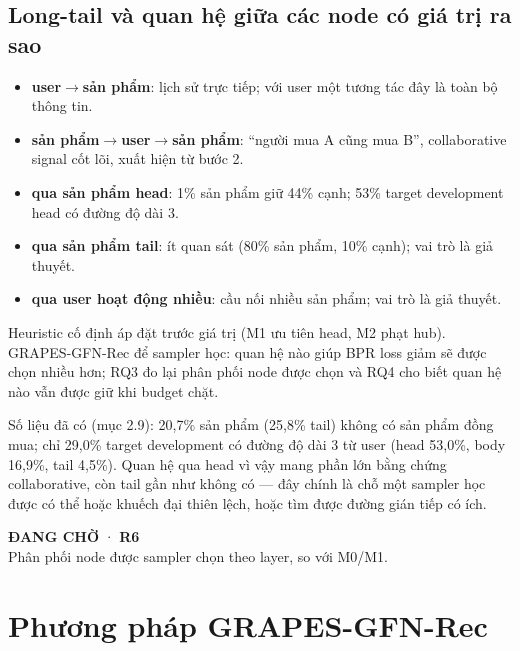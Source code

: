 \documentclass[11pt,a4paper,oneside]{report}
\newcommand{\pending}[2]{\begin{tcolorbox}[colback=amberpale,colframe=amber,boxrule=0.8pt,arc=2pt,left=6pt,right=6pt,top=4pt,bottom=4pt,fontupper=\small]\textbf{\color{coral}ĐANG CHỜ} · \textbf{#1}\\ #2\end{tcolorbox}}
\begin{document}
\section{Long-tail và quan hệ giữa các node có giá trị ra sao}
\begin{itemize}
\item \textbf{user$\rightarrow$sản phẩm}: lịch sử trực tiếp; với user một tương tác đây là toàn bộ thông tin.
\item \textbf{sản phẩm$\rightarrow$user$\rightarrow$sản phẩm}: ``người mua A cũng mua B'', collaborative signal cốt lõi, xuất hiện từ bước 2.
\item \textbf{qua sản phẩm head}: 1\% sản phẩm giữ 44\% cạnh; 53\% target development head có đường độ dài 3.
\item \textbf{qua sản phẩm tail}: ít quan sát (80\% sản phẩm, 10\% cạnh); vai trò là giả thuyết.
\item \textbf{qua user hoạt động nhiều}: cầu nối nhiều sản phẩm; vai trò là giả thuyết.
\end{itemize}
Heuristic cố định áp đặt trước giá trị (M1 ưu tiên head, M2 phạt hub). GRAPES-GFN-Rec để sampler học: quan hệ nào giúp BPR loss giảm sẽ được chọn nhiều hơn; RQ3 đo lại phân phối node được chọn và RQ4 cho biết quan hệ nào vẫn được giữ khi budget chặt.

Số liệu đã có (mục 2.9): 20,7\% sản phẩm (25,8\% tail) không có sản phẩm đồng mua; chỉ 29,0\% target development có đường độ dài 3 từ user (head 53,0\%, body 16,9\%, tail 4,5\%). Quan hệ qua head vì vậy mang phần lớn bằng chứng collaborative, còn tail gần như không có — đây chính là chỗ một sampler học được có thể hoặc khuếch đại thiên lệch, hoặc tìm được đường gián tiếp có ích.

\pending{R6}{Phân phối node được sampler chọn theo layer, so với M0/M1.}

\chapter{Phương pháp GRAPES-GFN-Rec}
\end{document}

